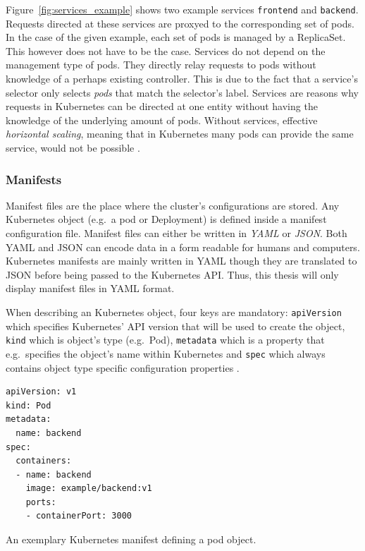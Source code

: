 Figure~\ref{fig:services_example} shows two example services \texttt{frontend}
and \texttt{backend}. Requests directed at these services are proxyed to the
corresponding set of pods. In the case of the given example, each set of pods
is managed by a ReplicaSet. This however does not have to be the case. Services
do not depend on the management type of pods. They directly relay requests to
pods without knowledge of a perhaps existing controller. This is due to the
fact that a service's selector only selects \textit{pods} that match the
selector's label. Services are reasons why requests in Kubernetes can be
directed at one entity without having the knowledge of the underlying amount of
pods. Without services, effective \textit{horizontal scaling}, meaning that in
Kubernetes many pods can provide the same service, would not be possible
\autocite[Ch. 5]{LuksaKubernetesAction2017}.

\subsubsection{Manifests}%
\label{ssub:Manifests}
Manifest files are the place where the cluster's configurations are stored. Any
Kubernetes object (e.g.\ a pod or Deployment) is defined inside a manifest
configuration file. Manifest files can either be written in \textit{YAML} or
\textit{JSON}. Both YAML and JSON can encode data in a form readable for humans
and computers. Kubernetes manifests are mainly written in YAML though they are
translated to JSON before being passed to the Kubernetes \ac{API}. Thus, this
thesis will only display manifest files in YAML format.

When describing an Kubernetes object, four keys are mandatory:
\texttt{apiVersion} which specifies Kubernetes' \ac{API} version that will be
used to create the object, \texttt{kind} which is object's type (e.g.\ Pod),
\texttt{metadata} which is a property that e.g.\ specifies the object's name
within Kubernetes and \texttt{spec} which always contains object type specific
configuration properties \autocite{AuthorsUnderstandingKubernetesObjects2019}.

\begin{listing}[H]
  \begin{verbatim}
apiVersion: v1
kind: Pod
metadata:
  name: backend
spec:
  containers:
  - name: backend
    image: example/backend:v1
    ports:
    - containerPort: 3000
  \end{verbatim}
  \caption{An exemplary Kubernetes manifest defining a pod object.}%
  \label{listing:manifest_example}
\end{listing}

